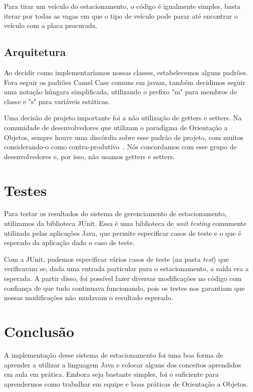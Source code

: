\documentclass{article}
\begin{document}
Para tirar um veículo do estacionamento, o código é igualmente simples, basta iterar por todas as vagas em que o tipo de veículo pode parar até encontrar o veículo com a placa procurada.

\subsection{Arquitetura}
Ao decidir como implementaríamos nossas classes, estabelecemos alguns padrões. Fora seguir os padrões Camel Case comuns em javam, também decidimos seguir uma notação húngara simplificada, utilizando o prefixo "m" para membros de classe e "s" para variáveis estáticas. 

Uma decisão de projeto importante foi a não utilização de getters e setters. Na comunidade de desenvolvedores que utilizam o paradigma de Orientação a Objetos, sempre houve uma discórdia sobre esse padrão de projeto, com muitos considerando-o como contra-produtivo~\cite{evil}. Nós concordamos com esse grupo de desenvolvedores e, por isso, não usamos getters e setters.

\section{Testes}
Para testar os resultados do sistema de gerenciamento de estacionamento, utilizamos da biblioteca JUnit. Essa é uma biblioteca de \emph{unit testing} comumente utilizada pelas aplicações Java, que permite especificar casos de teste e o que é esperado da aplicação dado o caso de teste.

Com a JUnit, pudemos especificar vários casos de teste (na pasta \emph{test}) que verificavam se, dada uma entrada particular para o estacionamento, a saída era a esperada. A partir disso, foi possível fazer diversas modificações no código com confiança de que tudo continuava funcionando, pois os testes nos garantiam que nossas modificações não mudavam o resultado esperado.

\section{Conclusão}
A implementação desse sistema de estacionamento foi uma boa forma de aprender a utilizar a linguagem Java e colocar alguns dos conceitos aprendidos em aula em prática. Embora seja bastante simples, foi o suficiente para aprendermos como trabalhar em equipe e boas práticas de Orientação a Objetos.



\end{document}
